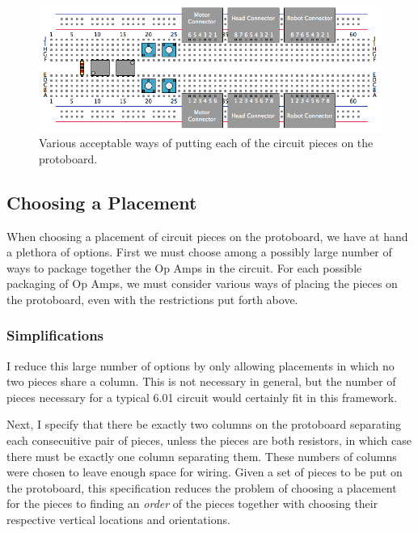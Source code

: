\begin{figure}
\begin{center}
\includegraphics[width=\linewidth]{Images/piece_placement_options.png}
\caption{Various acceptable ways of putting each of the circuit pieces on the
protoboard.}
\label{fig:piece_placement}
\end{center}
\end{figure}

\subsection{Choosing a Placement}

When choosing a placement of circuit pieces on the protoboard, we have at hand a
plethora of options. First we must choose among a possibly large number of ways
to package together the Op Amps in the circuit. For each possible packaging of
Op Amps, we must consider various ways of placing the pieces on the protoboard,
even with the restrictions put forth above.

\subsubsection{Simplifications}

I reduce this large number of options by only allowing placements in which no
two pieces share a column. This is not necessary in general, but the
number of pieces necessary for a typical 6.01 circuit would certainly fit in
this framework.

Next, I specify that there be exactly two columns on the protoboard separating
each consecuitive pair of pieces, unless the pieces are both resistors, in which
case there must be exactly one column separating them. These numbers of columns
were chosen to leave enough space for wiring. Given a set of pieces to be put on
the protoboard, this specification reduces the
problem of choosing a placement for the pieces to finding an \emph{order} of the
pieces together with choosing their respective vertical locations and
orientations.


